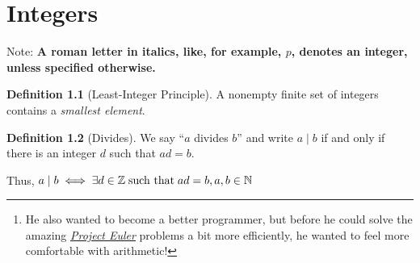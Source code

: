 \documentclass[english,notitlepage,smartquotes]{hgbreport}
\theoremstyle{definition}
\newtheorem*{definition}{Definition}
\theoremstyle{remark}
\theoremstyle{plain}
\begin{document}
\begin{abstract}
In the \emph{Preface}, Dudley writes,
\enquote{Number Theory problems can be difficult because inspiration is sometimes necessary to find a solution, and inspiration cannot be had to order. A student should not expect to be able to conquer all of the problems and should not feel discouraged if some are baffling. There is benefit in trying to solve problems whether a solution is found or not.}

We have all experienced the frustration and exaltation of solving problems. And, in arithmetic--the queen of mathematics--there is no dearth of beautiful and difficult problems. We should keep trying as long as doing so calmly feels worth the effort. Destructive perfectionism is not needed. The author undertook this project almost purely as a labor of love\footnote{He also wanted to become a better programmer, but before he could solve the amazing \href{https://projecteuler.net/about}{\emph{Project Euler}} problems a bit more efficiently, he wanted to feel more comfortable with arithmetic!}.

Every theorem in the book and its proof are provided. A table of theorems (proved or researched) is compiled here [\ref{tab:theorems}]. 
\end{abstract}

\tableofcontents

\chapter{Integers}


Note: \textbf{A roman letter in italics, like, for example, $p$, denotes an integer, unless specified otherwise.}
\begin{definition}[Least-Integer Principle]
A nonempty finite set of integers contains a \emph{smallest element}.
\end{definition}
\begin{definition}[Divides]
\label{def:divides}
We say ``$a$ divides $b$'' and write $a\mid b$ if and only if there is an integer $d$ such that $ad=b$.

Thus, $a\mid b \iff \exists d\in \mathbb{Z} \text{\;such that\;} ad=b,  a, b\in \mathbb{N}$
\end{definition}
\end{document}
